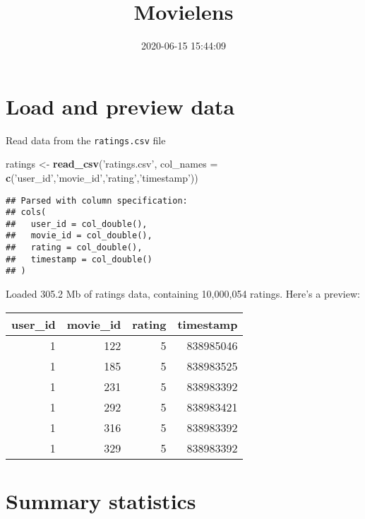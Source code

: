 \documentclass[
]{article}
\title{Movielens}
\author{}
\date{\vspace{-2.5em}2020-06-15 15:44:09}
\newenvironment{Shaded}{\begin{snugshade}}{\end{snugshade}}
\newcommand{\DataTypeTok}[1]{\textcolor[rgb]{0.13,0.29,0.53}{#1}}
\newcommand{\KeywordTok}[1]{\textcolor[rgb]{0.13,0.29,0.53}{\textbf{#1}}}
\newcommand{\NormalTok}[1]{#1}
\newcommand{\OperatorTok}[1]{\textcolor[rgb]{0.81,0.36,0.00}{\textbf{#1}}}
\newcommand{\StringTok}[1]{\textcolor[rgb]{0.31,0.60,0.02}{#1}}
\begin{document}
\maketitle

{
\setcounter{tocdepth}{3}
\tableofcontents
}
\hypertarget{load-and-preview-data}{%
\section{Load and preview data}\label{load-and-preview-data}}

Read data from the \texttt{ratings.csv} file

\begin{Shaded}
\begin{Highlighting}[]
\NormalTok{ratings <-}\StringTok{ }\KeywordTok{read_csv}\NormalTok{(}\StringTok{'ratings.csv'}\NormalTok{,}
                    \DataTypeTok{col_names =} \KeywordTok{c}\NormalTok{(}\StringTok{'user_id'}\NormalTok{,}\StringTok{'movie_id'}\NormalTok{,}\StringTok{'rating'}\NormalTok{,}\StringTok{'timestamp'}\NormalTok{))}
\end{Highlighting}
\end{Shaded}

\begin{verbatim}
## Parsed with column specification:
## cols(
##   user_id = col_double(),
##   movie_id = col_double(),
##   rating = col_double(),
##   timestamp = col_double()
## )
\end{verbatim}

Loaded 305.2 Mb of ratings data, containing 10,000,054 ratings. Here's a
preview:

\begin{Shaded}
\end{Shaded}

\begin{longtable}[]{@{}rrrr@{}}
\toprule
user\_id & movie\_id & rating & timestamp\tabularnewline
\midrule
\endhead
1 & 122 & 5 & 838985046\tabularnewline
1 & 185 & 5 & 838983525\tabularnewline
1 & 231 & 5 & 838983392\tabularnewline
1 & 292 & 5 & 838983421\tabularnewline
1 & 316 & 5 & 838983392\tabularnewline
1 & 329 & 5 & 838983392\tabularnewline
\bottomrule
\end{longtable}

\hypertarget{summary-statistics}{%
\section{Summary statistics}\label{summary-statistics}}
\end{document}
